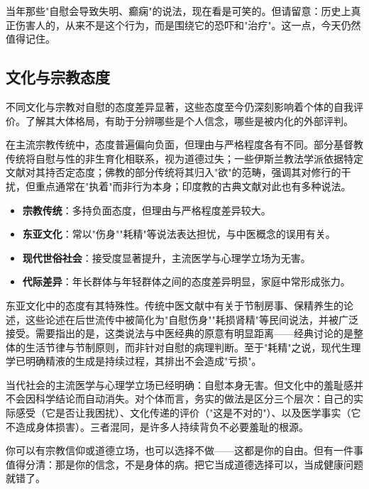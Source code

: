 \documentclass[12pt,UTF8]{ctexbook}
\newcommand{\keyword}[1]{\textbf{#1}}
\begin{document}
\begin{tcolorbox}[colback=pink!5!white,colframe=red!50!black,title=贴心小叮咛]
	当年那些"自慰会导致失明、癫痫"的说法，现在看是可笑的。但请留意：历史上真正伤害人的，从来不是这个行为，而是围绕它的恐吓和"治疗"。这一点，今天仍然值得记住。
\end{tcolorbox}
\subsection{文化与宗教态度}

不同文化与宗教对自慰的态度差异显著，这些态度至今仍深刻影响着个体的自我评价。了解其大体格局，有助于分辨哪些是个人信念，哪些是被内化的外部评判。

在主流宗教传统中，态度普遍偏向负面，但理由与严格程度各有不同。部分基督教传统将自慰与性的非生育化相联系，视为道德过失；一些伊斯兰教法学派依据特定文献对其持否定态度；佛教的部分传统将其归入"欲"的范畴，强调其对修行的干扰，但重点通常在"执着"而非行为本身；印度教的古典文献对此也有多种说法。

\begin{itemize}
	\item \keyword{宗教传统}：多持负面态度，但理由与严格程度差异较大。
	\item \keyword{东亚文化}：常以"伤身""耗精"等说法表达担忧，与中医概念的误用有关。
	\item \keyword{现代世俗社会}：接受度显著提升，主流医学与心理学立场为无害。
	\item \keyword{代际差异}：年长群体与年轻群体之间的态度差异明显，家庭中常形成张力。
\end{itemize}

东亚文化中的态度有其特殊性。传统中医文献中有关于节制房事、保精养生的论述，这些论述在后世流传中被简化为"自慰伤身""耗损肾精"等民间说法，并被广泛接受。需要指出的是，这类说法与中医经典的原意有明显距离——经典讨论的是整体的生活节律与节制原则，而非针对自慰的病理判断。至于"耗精"之说，现代生理学已明确精液的生成是持续过程，其排出不会造成"亏损"。

当代社会的主流医学与心理学立场已经明确：自慰本身无害。但文化中的羞耻感并不会因科学结论而自动消失。对个体而言，务实的做法是区分三个层次：自己的实际感受（它是否让我困扰）、文化传递的评价（"这是不对的"）、以及医学事实（它不造成身体损害）。三者混同，是许多人持续背负不必要羞耻的根源。

\begin{tcolorbox}[colback=pink!5!white,colframe=red!50!black,title=贴心小叮咛]
	你可以有宗教信仰或道德立场，也可以选择不做——这都是你的自由。但有一件事值得分清：那是你的信念，不是身体的病。把它当成道德选择可以，当成健康问题就错了。
\end{tcolorbox}
\end{document}

